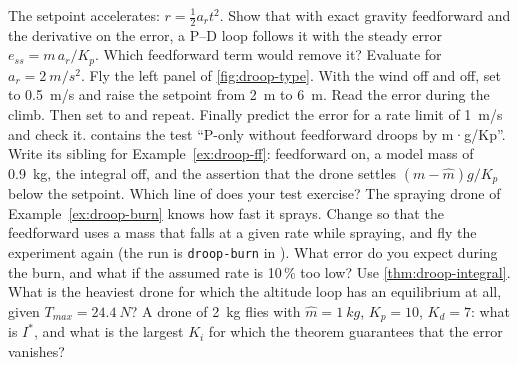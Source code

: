 \begin{exercises}
\exercise[2] The setpoint accelerates: $r = \tfrac12 a_r t^2$. Show that with exact gravity feedforward and the derivative on the error, a P–D loop follows it with the steady error $e_{ss} = m\,a_r/K_p$. Which feedforward term would remove it? Evaluate for $a_r = \SI{2}{m/s^2}$.
\exercise[2] Fly the left panel of \cref{fig:droop-type}. With the wind off and \It off, set  to \SI{0.5}{m/s} and raise the setpoint from \SI{2}{m} to \SI{6}{m}. Read the error during the climb. Then set  to  and repeat. Finally predict the error for a rate limit of \SI{1}{m/s} and check it.
\exercise[2]  contains the test \enquote{P-only without feedforward droops by m·g/Kp}. Write its sibling for Example~\ref{ex:droop-ff}: feedforward on, a model mass of \SI{0.9}{kg}, the integral off, and the assertion that the drone settles $(m - \hat m)g/K_p$ below the setpoint. Which line of  does your test exercise?
\exercise[3] The spraying drone of Example~\ref{ex:droop-burn} knows how fast it sprays. Change  so that the feedforward uses a mass that falls at a given rate while spraying, and fly the experiment again (the run is \texttt{droop-burn} in ). What error do you expect during the burn, and what if the assumed rate is 10\,\% too low?
\exercise[2] Use \cref{thm:droop-integral}. What is the heaviest drone for which the altitude loop has an equilibrium at all, given $T_{max} = \SI{24.4}{N}$? A drone of \SI{2}{kg} flies with $\hat m = \SI{1}{kg}$, $K_p = 10$, $K_d = 7$: what is $I^*$, and what is the largest $K_i$ for which the theorem guarantees that the error vanishes?
\end{exercises}
